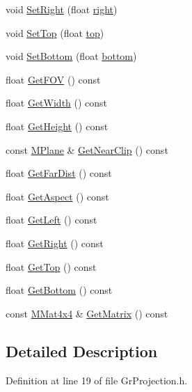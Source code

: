 \begin{CompactItemize}
\item 
void \hyperlink{class_gr_projection_5173c72eefb3030bbd7cf65be54aabcc}{SetRight} (float \hyperlink{glext_8h_5ffadbbacc6b89cf6218bc43b384d3fe}{right})
\item 
void \hyperlink{class_gr_projection_6d503181e9a11c369200bc57226aa6e5}{SetTop} (float \hyperlink{glext_8h_5ab323daeacf8dfdb8f91132fecdca23}{top})
\item 
void \hyperlink{class_gr_projection_f2103c25c9b29dccb2630e671b486147}{SetBottom} (float \hyperlink{glext_8h_95fc257e5ddf46f7db9d5e898cdf1991}{bottom})
\item 
float \hyperlink{class_gr_projection_6460a0de198599bf156dc32d059cccbe}{GetFOV} () const 
\item 
float \hyperlink{class_gr_projection_eac5317efd520d72958216a801915f35}{GetWidth} () const 
\item 
float \hyperlink{class_gr_projection_e09864554d7c9d1d2a28545bccb92fa4}{GetHeight} () const 
\item 
const \hyperlink{class_m_plane}{MPlane} \& \hyperlink{class_gr_projection_4d85a9dab08ee6ed9e840d34c1d9ea4e}{GetNearClip} () const 
\item 
float \hyperlink{class_gr_projection_ff3730ac4fd84de25306fa8e6d1abfa6}{GetFarDist} () const 
\item 
float \hyperlink{class_gr_projection_5690aacaed6e6c2e123bb96124253744}{GetAspect} () const 
\item 
float \hyperlink{class_gr_projection_259e5d940d8cd6685eafe37eb541238e}{GetLeft} () const 
\item 
float \hyperlink{class_gr_projection_076356ed413ff2aaab1b0f6af4cf8a3c}{GetRight} () const 
\item 
float \hyperlink{class_gr_projection_08d099fb02121d3ee0d6f4637c796ae7}{GetTop} () const 
\item 
float \hyperlink{class_gr_projection_ba40dc8e83e97f131286ef4daff3f459}{GetBottom} () const 
\item 
const \hyperlink{class_m_mat4x4}{MMat4x4} \& \hyperlink{class_gr_projection_1255da0c4733b6c9b53bb6d7266a6315}{GetMatrix} () const 
\end{CompactItemize}


\subsection{Detailed Description}


Definition at line 19 of file GrProjection.h.

